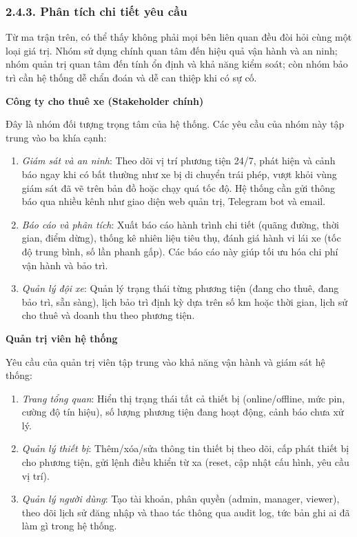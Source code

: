 \documentclass[a4paper]{extarticle}
\providecommand{\tightlist}{%
  \setlength{\itemsep}{0pt}\setlength{\parskip}{0pt}}
\begin{document}
\subsubsection{2.4.3. Phân tích chi tiết yêu
cầu}\label{243-phuxe2n-tuxedch-chi-tiux1ebft-yuxeau-cux1ea7u}

Từ ma trận trên, có thể thấy không phải mọi bên liên quan đều đòi hỏi cùng
một loại giá trị. Nhóm sử dụng chính quan tâm đến hiệu quả vận hành và an
ninh; nhóm quản trị quan tâm đến tính ổn định và khả năng kiểm soát; còn
nhóm bảo trì cần hệ thống dễ chẩn đoán và dễ can thiệp khi có sự cố.

\textbf{Công ty cho thuê xe (Stakeholder chính)}

Đây là nhóm đối tượng trọng tâm của hệ thống. Các yêu cầu của nhóm này
tập trung vào ba khía cạnh:

\begin{enumerate}
\def\labelenumi{\arabic{enumi}.}
\tightlist
\item
  \emph{Giám sát và an ninh}: Theo dõi vị trí phương tiện 24/7, phát
  hiện và cảnh báo ngay khi có bất thường như xe bị di chuyển trái phép,
  vượt khỏi vùng giám sát đã vẽ trên bản đồ hoặc chạy quá tốc độ. Hệ
  thống cần gửi thông báo qua nhiều kênh như giao diện web quản trị,
  Telegram bot và email.
\item
  \emph{Báo cáo và phân tích}: Xuất báo cáo hành trình chi tiết (quãng
  đường, thời gian, điểm dừng), thống kê nhiên liệu tiêu thụ, đánh giá
  hành vi lái xe (tốc độ trung bình, số lần phanh gấp). Các báo cáo này
  giúp tối ưu hóa chi phí vận hành và bảo trì.
\item
  \emph{Quản lý đội xe}: Quản lý trạng thái từng phương tiện (đang cho
  thuê, đang bảo trì, sẵn sàng), lịch bảo trì định kỳ dựa trên số km
  hoặc thời gian, lịch sử cho thuê và doanh thu theo phương tiện.
\end{enumerate}

\textbf{Quản trị viên hệ thống}

Yêu cầu của quản trị viên tập trung vào khả năng vận hành và giám sát hệ
thống:

\begin{enumerate}
\def\labelenumi{\arabic{enumi}.}
\tightlist
\item
  \emph{Trang tổng quan}: Hiển thị trạng thái tất cả thiết bị
  (online/offline, mức pin, cường độ tín hiệu), số lượng phương tiện
  đang hoạt động, cảnh báo chưa xử lý.
\item
  \emph{Quản lý thiết bị}: Thêm/xóa/sửa thông tin thiết bị theo dõi, cấp
  phát thiết bị cho phương tiện, gửi lệnh điều khiển từ xa (reset, cập
  nhật cấu hình, yêu cầu vị trí).
\item
  \emph{Quản lý người dùng}: Tạo tài khoản, phân quyền (admin, manager,
  viewer), theo dõi lịch sử đăng nhập và thao tác thông qua audit log,
  tức bản ghi ai đã làm gì trong hệ thống.
\end{enumerate}
\end{document}

